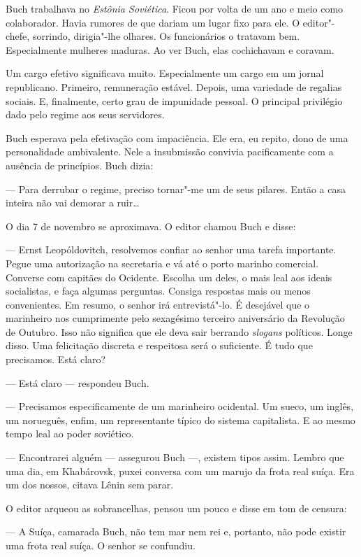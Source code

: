 Buch trabalhava no \emph{Estônia Soviética}. Ficou por volta de um ano e
meio como colaborador. Havia rumores de que dariam um lugar fixo para
ele. O editor"-chefe, sorrindo, dirigia"-lhe olhares. Os funcionários o
tratavam bem. Especialmente mulheres maduras. Ao ver Buch, elas
cochichavam e coravam.

Um cargo efetivo significava muito. Especialmente um cargo em um jornal
republicano. Primeiro, remuneração estável. Depois, uma variedade de
regalias sociais. E, finalmente, certo grau de impunidade pessoal. O
principal privilégio dado pelo regime aos seus servidores.

Buch esperava pela efetivação com impaciência. Ele era, eu repito, dono
de uma personalidade ambivalente. Nele a insubmissão convivia
pacificamente com a ausência de princípios. Buch dizia:

--- Para derrubar o regime, preciso tornar"-me um de seus pilares. Então
a casa inteira não vai demorar a ruir\ldots{}

O dia 7 de novembro se aproximava. O editor chamou Buch e disse:

--- Ernst Leopóldovitch, resolvemos confiar ao senhor uma tarefa
importante. Pegue uma autorização na secretaria e vá até o porto marinho
comercial. Converse com capitães do Ocidente. Escolha um deles, o mais
leal aos ideais socialistas, e faça algumas perguntas. Consiga respostas
mais ou menos convenientes. Em resumo, o senhor irá entrevistá"-lo. É
desejável que o marinheiro nos cumprimente pelo sexagésimo terceiro
aniversário da Revolução de Outubro. Isso não significa que ele deva
sair berrando \emph{slogans} políticos. Longe disso. Uma felicitação
discreta e respeitosa será o suficiente. É tudo que precisamos. Está
claro?

--- Está claro --- respondeu Buch.

--- Precisamos especificamente de um marinheiro ocidental. Um sueco, um
inglês, um norueguês, enfim, um representante típico do sistema
capitalista. E ao mesmo tempo leal ao poder soviético.

--- Encontrarei alguém --- assegurou Buch ---, existem tipos assim.
Lembro que uma dia, em Khabárovsk, puxei conversa com um marujo da frota
real suíça. Era um dos nossos, citava Lênin sem parar.

O editor arqueou as sobrancelhas, pensou um pouco e disse em tom de
censura:

--- A Suíça, camarada Buch, não tem mar nem rei e, portanto, não pode
existir uma frota real suíça. O senhor se confundiu.

